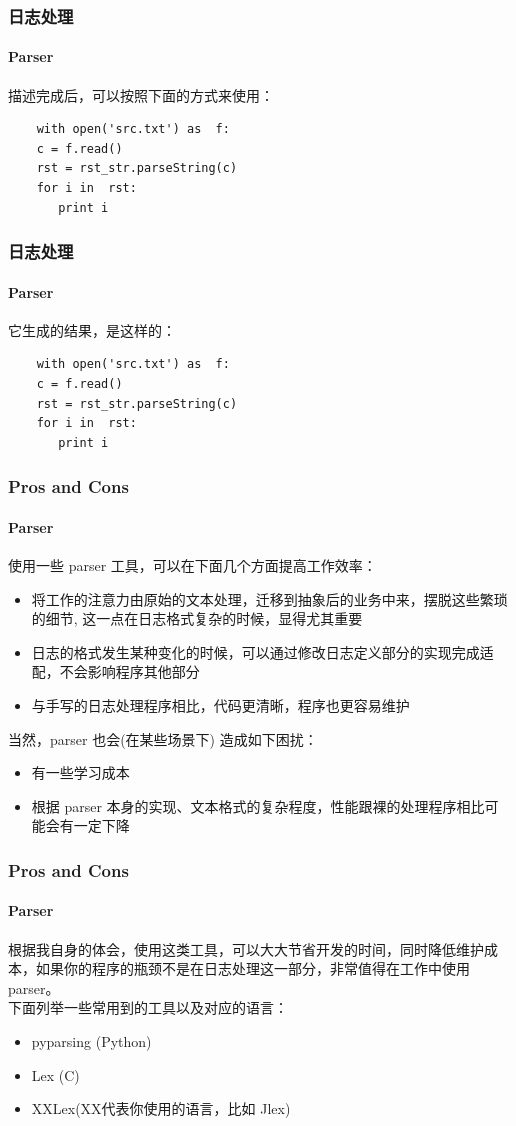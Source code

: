 \begin{frame}[fragile]
  \frametitle{日志处理}
  \framesubtitle{Parser}
  描述完成后，可以按照下面的方式来使用：

  \begin{verbatim}
    with open('src.txt') as  f:
    c = f.read()
    rst = rst_str.parseString(c)
    for i in  rst:
       print i
  \end{verbatim}
\end{frame}

\begin{frame}[fragile]
  \frametitle{日志处理}
  \framesubtitle{Parser}
  它生成的结果，是这样的：

  \begin{verbatim}
    with open('src.txt') as  f:
    c = f.read()
    rst = rst_str.parseString(c)
    for i in  rst:
       print i
  \end{verbatim}
\end{frame}


\begin{frame}[fragile]
  \frametitle{Pros and Cons}
  \framesubtitle{Parser}
  
  使用一些 parser 工具，可以在下面几个方面提高工作效率：
  
  \begin{itemize}
  \item 将工作的注意力由原始的文本处理，迁移到抽象后的业务中来，摆脱这些繁琐的细节, 这一点在日志格式复杂的时候，显得尤其重要
  \item 日志的格式发生某种变化的时候，可以通过修改日志定义部分的实现完成适配，不会影响程序其他部分
    \item 与手写的日志处理程序相比，代码更清晰，程序也更容易维护
  \end{itemize}

  当然，parser 也会(在某些场景下) 造成如下困扰：
  
  \begin{itemize}
  \item 有一些学习成本
    \item 根据 parser 本身的实现、文本格式的复杂程度，性能跟裸的处理程序相比可能会有一定下降
  \end{itemize}
\end{frame}

\begin{frame}[fragile]
  \frametitle{Pros and Cons}
  \framesubtitle{Parser}
  
  根据我自身的体会，使用这类工具，可以大大节省开发的时间，同时降低维护成本，如果你的程序的瓶颈不是在日志处理这一部分，非常值得在工作中使用 parser。\\
  下面列举一些常用到的工具以及对应的语言：
  
  \begin{itemize}
  \item pyparsing (Python)
  \item Lex (C)
  \item XXLex(XX代表你使用的语言，比如 Jlex)
  \end{itemize}
\end{frame}

